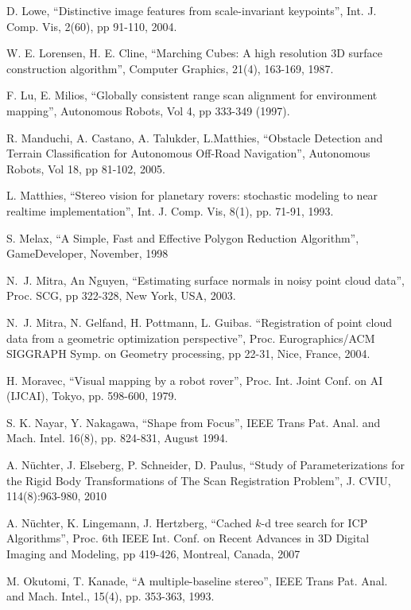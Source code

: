 \documentclass[twocolumn,oneside]{book}
\begin{document}
\begin{thebibliography}{99}
D. Lowe, 
``Distinctive image features from scale-invariant keypoints'',
Int. J. Comp. Vis, 2(60), pp 91-110, 2004.

W. E. Lorensen, H. E. Cline,
``Marching Cubes: A high resolution 3D surface construction algorithm'',
Computer Graphics, 21(4), 163-169, 1987.

F. Lu, E. Milios,
``Globally consistent range scan alignment for environment mapping'',
Autonomous Robots, Vol 4, pp 333-349 (1997).

R. Manduchi, A. Castano, A. Talukder, L.Matthies,
``Obstacle Detection and Terrain Classification for Autonomous Off-Road Navigation'',
Autonomous Robots, Vol 18, pp 81-102, 2005.

L. Matthies,
``Stereo vision for planetary rovers: stochastic
modeling to near realtime implementation'',
Int. J. Comp. Vis,  8(1), pp. 71-91, 1993.

S. Melax,
``A Simple, Fast and Effective Polygon Reduction Algorithm'',
GameDeveloper, November, 1998

N.~J. Mitra, An Nguyen,
``Estimating surface normals in noisy point cloud data'',
Proc. SCG, pp 322-328, New York, USA, 2003.
  
N.~J. Mitra, N. Gelfand, H. Pottmann, L. Guibas. 
``Registration of point cloud data from a geometric optimization perspective'',
Proc. Eurographics/ACM SIGGRAPH Symp. on Geometry processing, pp 22-31,
Nice, France, 2004.

H. Moravec, 
``Visual mapping by a robot rover'',
Proc. Int. Joint Conf. on AI (IJCAI), Tokyo, pp. 598-600, 1979.

S. K. Nayar, Y. Nakagawa, 
``Shape from Focus'',
IEEE Trans Pat. Anal. and Mach. Intel. 16(8), pp. 824-831, August 1994.

A. N{\"u}chter, J. Elseberg, P. Schneider, D. Paulus,
``Study of Parameterizations for the Rigid Body Transformations of The Scan Registration Problem'',
J. CVIU, 114(8):963-980, 2010

A. N{\"u}chter, K. Lingemann, J. Hertzberg,
``Cached $k$-d tree search for ICP Algorithms'',
Proc. 6th IEEE Int. Conf. on Recent Advances in 3D Digital Imaging and Modeling,
pp 419-426, Montreal, Canada, 2007

M. Okutomi, T. Kanade,
``A multiple-baseline stereo'',
IEEE Trans Pat. Anal. and Mach. Intel., 15(4), pp. 353-363, 1993.


\end{thebibliography}
\end{document}
